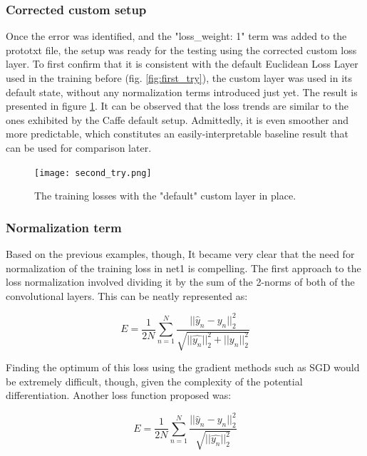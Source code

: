 \documentclass[a4paper, 12pt]{article}
\numberwithin{equation}{section}
\begin{document}
	\subsubsection{Corrected custom setup}
	
	Once the error was identified, and the "loss\_weight: 1" term was added to the prototxt file, the setup was ready for the testing using the corrected custom loss layer. To first confirm that it is consistent with the default Euclidean Loss Layer used in the training before (fig. \ref{fig:first_try}), the custom layer was used in its default state, without any normalization terms introduced just yet. The result is presented in figure \ref{fig:second_try}. It can be observed that the loss trends are similar to the ones exhibited by the Caffe default setup. Admittedly, it is even smoother and more predictable, which constitutes an easily-interpretable baseline result that can be used for comparison later.
	
	\begin{figure}[!h]
		\centering
		\texttt{[image: second\_try.png]}
		\caption{\label{fig:second_try}{The training losses with the "default" custom layer in place.}}
	\end{figure}
	
	\subsubsection{Normalization term }
	
	Based on the previous examples, though, It became very clear that the need for normalization of the training loss in net1 is compelling. The first approach to the loss normalization involved dividing it by the sum of the 2-norms of both of the convolutional layers. This can be neatly represented as:
	
	\begin{equation}
	E=\frac{1}{2N} \sum_{n=1}^{N} \frac{ ||\hat{y}_n-y_n||^2_2}{\sqrt{||\hat{y_n}||^2_2+||y_n||^2_2}} 
	\end{equation}
	
	Finding the optimum of this loss using the gradient methods such as SGD would be extremely difficult, though, given the complexity of the potential differentiation. Another loss function proposed was:
	
	\begin{equation}
	E=\frac{1}{2N} \sum_{n=1}^{N} \frac{ ||\hat{y}_n-y_n||^2_2}{\sqrt{||\hat{y_n}||^2_2}} 
	\end{equation}
	
\end{document}
